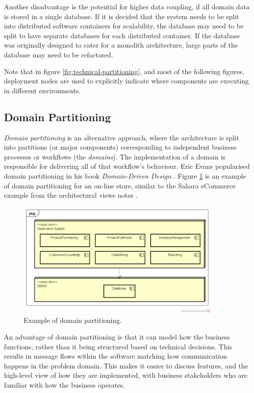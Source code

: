 Another disadvantage is the potential for higher data coupling, if all domain data is stored in a single database.
If it is decided that the system needs to be split into distributed software containers for scalability,
the database may need to be split to have separate databases for each distributed container.
If the database was originally designed to cater for a monolith architecture, large parts of the database may need to be refactored.

Note that in figure \ref{fig:technical-partitioning}, and most of the following figures,
deployment nodes are used to explicitly indicate where components are executing in different environments.

\subsection{Domain Partitioning}
\emph{Domain partitioning} is an alternative approach, where the architecture is split into partitions (or major components)
corresponding to independent business processes or workflows (the \emph{domains}).
The implementation of a domain is responsible for delivering all of that workflow's behaviour.
Eric Evans popularised domain partitioning in his book \textit{Domain-Driven Design} \cite{ddd-evans}.
Figure \ref{fig:domain-partitioning} is an example of domain partitioning for an on-line store, similar to the
Sahara eCommerce example from the architectural views notes \cite{view-notes}.

\begin{figure}[h!]
    \centering
    \includegraphics[trim=38 42 19 44,clip,width=0.9\textwidth]{diagrams/domain-partitioning.png}
    \caption{Example of domain partitioning.}
    \label{fig:domain-partitioning}
\end{figure}

An advantage of domain partitioning is that it can model how the business functions, rather than it being structured based on technical decisions.
This results in message flows within the software matching how communication happens in the problem domain.
This makes it easier to discuss features, and the high-level view of how they are implemented, with business stakeholders who are familiar with how the business operates.


